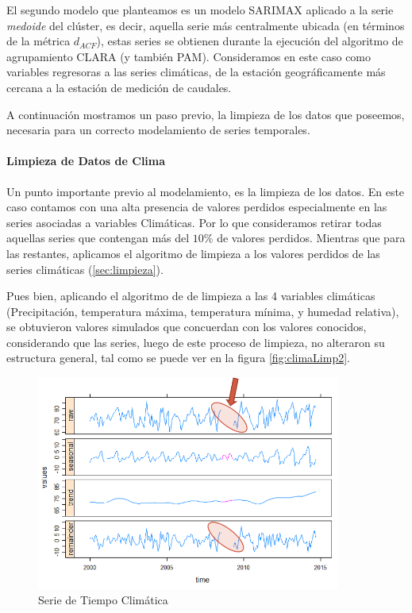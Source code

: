\documentclass[12pt,oneside]{book}\usepackage[]{graphicx}\usepackage[]{color}
\theoremstyle{definition} %
\begin{document}
El segundo modelo que planteamos es un modelo SARIMAX aplicado a la serie \textit{medoide} del clúster, es decir, aquella serie más centralmente ubicada (en términos de la métrica $d_{ACF}$), estas series se obtienen durante la ejecución del algoritmo de agrupamiento CLARA (y también PAM). Consideramos en este caso como variables regresoras a las series climáticas, de la estación geográficamente más cercana a la estación de medición de caudales.

A continuación mostramos un paso previo, la limpieza de los datos que poseemos, necesaria para un correcto modelamiento de series temporales.

\paragraph{Limpieza de Datos de Clima} Un punto importante previo al modelamiento, es la limpieza de los datos. En este caso contamos con una alta presencia de valores perdidos especialmente en las series asociadas a variables Climáticas. Por lo que consideramos retirar todas aquellas series que contengan más del $10\%$ de valores perdidos. 
Mientras que para las restantes, aplicamos el algoritmo de limpieza a los valores perdidos de las series climáticas  (\ref{sec:limpieza}). 

Pues bien, aplicando el algoritmo de de limpieza a las 4 variables climáticas (Precipitación, temperatura máxima, temperatura mínima, y humedad relativa), se obtuvieron valores simulados que concuerdan con los valores conocidos, considerando que las series, luego de este proceso de limpieza, no alteraron su estructura general, tal como se puede ver en la figura \ref{fig:climaLimp2}.



\begin{figure}[H]
\centering
\includegraphics[width=10cm]{Cap3-Metodologia/limpieza.png}
\caption{Serie de Tiempo Climática}
\label{fig:clima2}

\end{figure}
\end{document}
